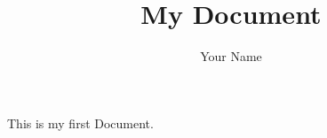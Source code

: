 \documentclass[a4,oneside]{report}
\title{My Document}
\author{Your Name}
\begin{document}
\maketitle
This is my first Document.
\end{document}
